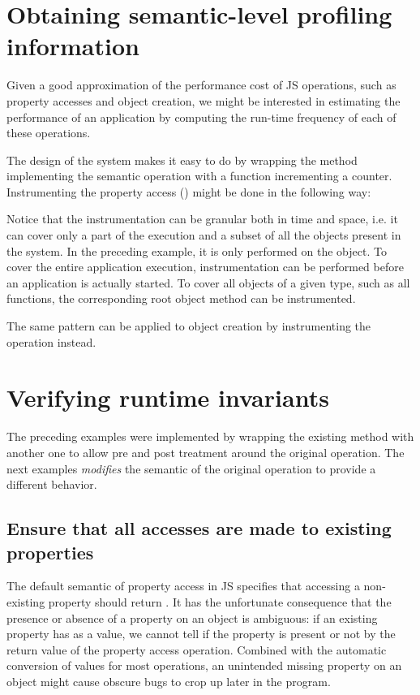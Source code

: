 \section{Obtaining semantic-level profiling information}

Given a good approximation of the performance cost of JS operations, such as
property accesses and object creation, we might be interested in estimating the
performance of an application by computing the run-time frequency of each of
these operations.

The design of the system makes it easy to do by wrapping the method
implementing the semantic operation with a function incrementing a counter.
Instrumenting the property access () might be done in the
following way:


Notice that the instrumentation can be granular both in time and space, i.e. it
can cover only a part of the execution and a subset of all the objects present
in the system. In the preceding example, it is only performed on the 
object. To cover the entire application execution, instrumentation can be performed before
an application is actually started. To cover all objects of a given type, such
as all functions, the corresponding root object method can be instrumented.

The same pattern can be applied to object creation by instrumenting the
 operation instead.


\section{Verifying runtime invariants}

The preceding examples were implemented by wrapping the existing method with
another one to allow pre and post treatment around the original operation. The
next examples \textit{modifies} the semantic of the original operation to
provide a different behavior.

\subsection{Ensure that all accesses are made to existing properties}

The default semantic of property access in JS specifies that accessing
a non-existing property should return . It has the unfortunate
consequence that the presence or absence of a property on an object is
ambiguous: if an existing property has  as a value, we cannot
tell if the property is present or not by the return value of the property
access operation. Combined with the automatic conversion of values for most
operations, an unintended missing property on an object might cause obscure
bugs to crop up later in the program.

